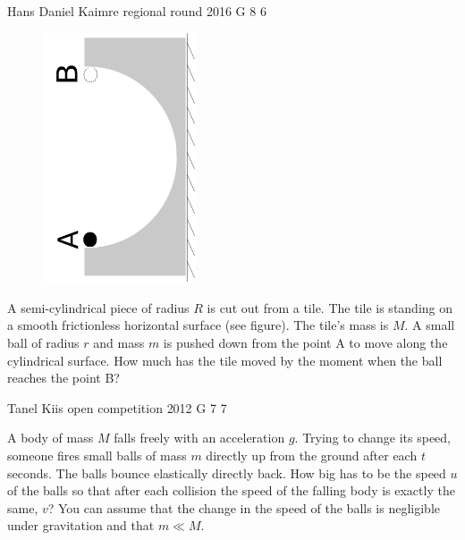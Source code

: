 \documentclass[11pt]{article}
\begin{document}
{Hans Daniel Kaimre} %
{regional round} %
{2016} %
{G 8} %
{6} %
{

\ifEngStatement
\begin{figure}
	\vspace{-10pt}
	\includegraphics[angle=-90,origin=c,width=0.4\textwidth]{2016-v2g-08-halfpipe}
	\vspace{-60pt}
\end{figure}
A semi-cylindrical piece of radius $R$ is cut out from a tile. The tile is standing on a smooth frictionless horizontal surface (see figure). The tile’s mass is $M$. A small ball of radius $r$ and mass $m$ is pushed down from the point A to move along the cylindrical surface. How much has the tile moved by the moment when the ball reaches the point B?
\fi
}

{Tanel Kiis} %
{open competition} %
{2012} %
{G 7} %
{7} %
{

\ifEngStatement
A body of mass $M$ falls freely with an acceleration $g$. Trying to change its speed, someone fires small balls of mass $m$ directly up from the ground after each $t$ seconds. The balls bounce elastically directly back. How big has to be the speed $u$ of the balls so that after each collision the speed of the falling body is exactly the same, $v$? You can assume that the change in the speed of the balls is negligible under gravitation and that $m\ll M$.
\fi
}
\end{document}
